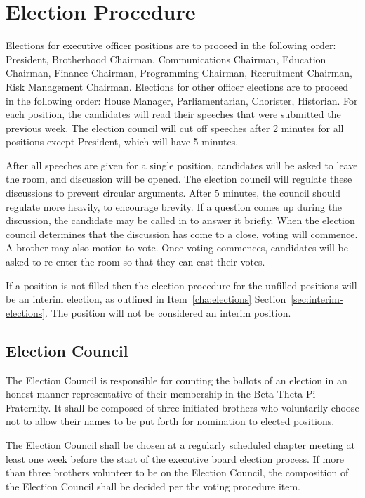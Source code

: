 \section{Election Procedure}
\label{sec:election-procedure}

Elections for executive officer positions are to proceed in the following order:
President, Brotherhood Chairman, Communications Chairman, Education Chairman,
Finance Chairman, Programming Chairman, Recruitment Chairman, Risk Management
Chairman.
Elections for other officer elections are to proceed in the following order:
House Manager, Parliamentarian, Chorister, Historian.
For each position, the candidates will read their speeches that were submitted
the previous week.
The election council will cut off speeches after 2 minutes for all positions
except President, which will have 5 minutes.

After all speeches are given for a single position, candidates will be asked to
leave the room, and discussion will be opened.
The election council will regulate these discussions to prevent circular
arguments.
After 5 minutes, the council should regulate more heavily, to encourage brevity.
If a question comes up during the discussion, the candidate may be called in to
answer it briefly.
When the election council determines that the discussion has come to a close,
voting will commence.
A brother may also motion to vote.
Once voting commences, candidates will be asked to re-enter the room so that
they can cast their votes.

If a position is not filled then the election procedure for the unfilled
positions will be an interim election, as outlined in Item~\ref{cha:elections}
Section~\ref{sec:interim-elections}.
The position will not be considered an interim position.

\subsection{Election Council}
\label{sec:election-council}

The Election Council is responsible for counting the ballots of an election in
an honest manner representative of their membership in the Beta Theta Pi
Fraternity.
It shall be composed of three initiated brothers who voluntarily choose not to
allow their names to be put forth for nomination to elected positions.

The Election Council shall be chosen at a regularly scheduled chapter meeting at
least one week before the start of the executive board election process.
If more than three brothers volunteer to be on the Election Council, the
composition of the Election Council shall be decided per the voting procedure
item.


